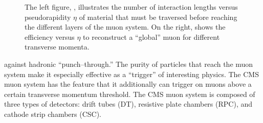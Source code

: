 \begin{figure}
  \centering
   \label{fig:DetectorChapterMuonShit}
  \caption[Muon system material budget and identification efficiency]{The left
  figure, , illustrates the number of
  interaction lengths versus pseudorapidity $\eta$ of material that must be
  traversed before reaching the different layers of the muon system.  On the
  right,  shows the efficiency versus $\eta$
  to reconstruct a ``global'' muon for different transverse momenta.}
\end{figure}
against hadronic ``punch--through.''  The purity of particles that reach the
muon system make it especially effective as a ``trigger'' of interesting
physics. The CMS muon system has the feature that it additionally can trigger on
muons above a certain transverse momentum threshold. The CMS muon system is composed of three types
of detectors: drift tubes (DT), resistive plate chambers (RPC), and cathode
strip chambers (CSC).  

